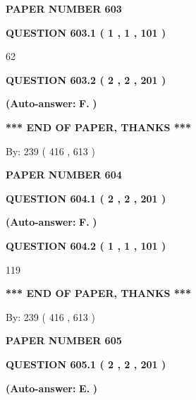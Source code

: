 \documentclass[12pt]{article}
\begin{document}
   
\newpage 
\setcounter{page}{ 
   603001 } 
   
   
 {\textbf{ \Large{ PAPER NUMBER  603  }}}
   
   
   
   
  
  
{\textbf{\large{QUESTION
603.1 
 ( 1 , 1 , 101 )
}}}

62
  
  
{\textbf{\large{QUESTION
603.2 
 ( 2 , 2 , 201 )
}}}
 
 
{\textbf{(Auto-answer:}}
{\textbf{\large{
F.}}}
{\textbf{)}}
 
 
   
   
   
   
\vspace{1.0in} 
{\textbf{\large{ *** END OF PAPER, THANKS *** }}} 
   
   
\hspace{1.0in} By: 
 239 ( 416 ,  613 )
   
   
   
   
\newpage 
\setcounter{page}{ 
   604001 } 
   
   
 {\textbf{ \Large{ PAPER NUMBER  604  }}}
   
   
   
   
  
  
{\textbf{\large{QUESTION
604.1 
 ( 2 , 2 , 201 )
}}}
 
 
{\textbf{(Auto-answer:}}
{\textbf{\large{
F.}}}
{\textbf{)}}
 
 
  
  
{\textbf{\large{QUESTION
604.2 
 ( 1 , 1 , 101 )
}}}

119
   
   
   
   
\vspace{1.0in} 
{\textbf{\large{ *** END OF PAPER, THANKS *** }}} 
   
   
\hspace{1.0in} By: 
 239 ( 416 ,  613 )
   
   
   
   
\newpage 
\setcounter{page}{ 
   605001 } 
   
   
 {\textbf{ \Large{ PAPER NUMBER  605  }}}
   
   
   
   
  
  
{\textbf{\large{QUESTION
605.1 
 ( 2 , 2 , 201 )
}}}
 
 
{\textbf{(Auto-answer:}}
{\textbf{\large{
E.}}}
{\textbf{)}}
 
 
  
\end{document}
